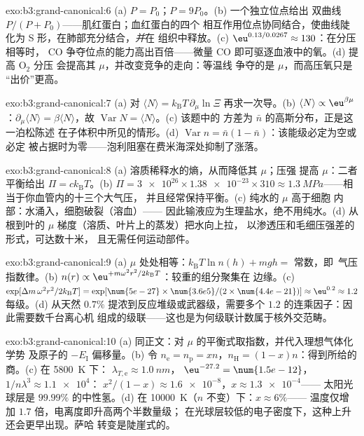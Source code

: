 \begin{solution}{exo:b3:grand-canonical:6}
(a) $P = P_0$；$P = 9P_0$。(b) 一个独立位点给出
双曲线 $P/(P + P_0)$——肌红蛋白；血红蛋白的四个
相互作用位点协同结合，使曲线陡化为
S 形，在肺部充分结合，\emph{并}在
组织中释放。(c) $\eu^{0.13/0.0267} \approx 130$：在分压相等时，
CO 争夺位点的能力高出百倍——微量 CO
即可驱逐血液中的氧。(d) 提高 O$_2$ 分压
会提高其 $\mu$，并改变竞争的走向：等温线
争夺的是 $\mu$，而高压氧只是
“出价”更高。
\end{solution}

\begin{solution}{exo:b3:grand-canonical:7}
(a) 对 $\langle N\rangle = k_{\text{B}}T\,\partial_\mu
\ln\Xi$ 再求一次导。(b) $\langle N\rangle \propto
\eu^{\beta\mu}$：$\partial_\mu\langle N\rangle = \beta\langle
N\rangle$，故 $\operatorname{Var}N = \langle N\rangle$。(c) 该题中的
方差为 $\bar n$ 的高斯分布，正是这一泊松陈述
在子体积中所见的情形。(d) $\operatorname{Var}n =
\bar n(1 - \bar n)$：该能级必定为空或必定
被占据时为零——泡利阻塞在费米海深处抑制了涨落。
\end{solution}

\begin{solution}{exo:b3:grand-canonical:8}
(a) 溶质稀释水的熵，从而降低其 $\mu$；压强
提高 $\mu$：二者平衡给出 $\Pi = ck_{\text{B}}T$。(b) $\Pi =
\num{3e26} \times \num{1.38e-23} \times 310 \approx
\qty{1.3}{MPa}$——相当于你血管内的十三个大气压，
并且经常保持平衡。(c) 纯水的 $\mu$ 高于细胞
内部：水涌入，细胞破裂（溶血）——
因此输液应为生理盐水，绝不用纯水。(d) 从根到叶的
$\mu$ 梯度（溶质、叶片上的蒸发）把水向上拉，
以渗透压和毛细压强差的形式，可达数十米，
且无需任何运动部件。
\end{solution}

\begin{solution}{exo:b3:grand-canonical:9}
(a) $\mu$ 处处相等：$k_{\text{B}}T\ln n(h) + mgh = $ 常数，即\
气压指数律。(b) $n(r) \propto
\eu^{+m\omega^2r^2/2k_{\text{B}}T}$：较重的组分聚集在
边缘。(c) $\exp[\Delta m\,\omega^2r^2/2k_{\text{B}}T] =
\exp[\num{5e-27} \times \num{3.6e5}/(2 \times \num{4.4e-21})]
\approx \eu^{0.2} \approx 1.2$ 每级。(d) 从天然
$0.7\%$ 提浓到反应堆级或武器级，需要多个
$1.2$ 的连乘因子：因此需要数千台离心机
组成的级联——这也是为何级联计数属于核外交范畴。
\end{solution}

\begin{solution}{exo:b3:grand-canonical:10}
(a) 同正文：对 $\mu$ 的平衡式取指数，并代入理想气体化学势
及原子的 $-E_{\text{I}}$ 偏移量。(b)
令 $n_{\text{e}} = n_{\text{p}} = xn$，$n_{\text{H}} =
(1-x)n$：得到所给的商。(c) 在 \qty{5800}{K} 下：
$\lambda_{T,\text{e}} \approx \qty{1.0}{nm}$，
$\eu^{-27.2} = \num{1.5e-12}$，$1/n\lambda^3 \approx \num{1.1e4}$：
$x^2/(1-x) \approx \num{1.6e-8}$，$x \approx \num{1.3e-4}$——
太阳光球层是 $99.99\%$ 的中性氢。(d) 在
\qty{10000}{K}（$n$ 不变）下：$x \approx 6\%$——
温度仅增加 $1.7$ 倍，电离度即升高两个半数量级；
在光球层较低的电子密度下，这种上升还会更早出现。萨哈
转变是陡崖式的。
\end{solution}

